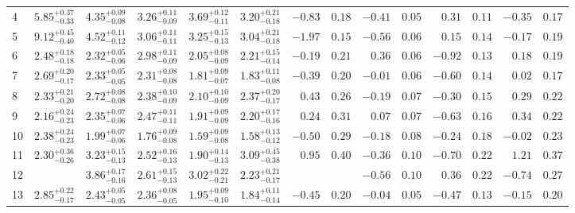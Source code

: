 \begin{tabular}{@{}l ccccc r@{ $\pm$ }l r@{ $\pm$ }l r@{ $\pm$ }l r@{ $\pm$ }l @{}}
\cmidrule{1-14}
4 & ${5.85}^{+0.37}_{-0.33}$ & ${4.35}^{+0.09}_{-0.08}$ & ${3.26}^{+0.11}_{-0.09}$ & ${3.69}^{+0.12}_{-0.11}$ & ${3.20}^{+0.21}_{-0.18}$
  & $-0.83$ & $0.18$ & $-0.41$ & $0.05$ & $0.31$ & $0.11$ & $-0.35$ & $0.17$ \\ [0.5em]
5 & ${9.12}^{+0.45}_{-0.40}$ & ${4.52}^{+0.11}_{-0.12}$ & ${3.06}^{+0.11}_{-0.11}$ & ${3.25}^{+0.15}_{-0.13}$ & ${3.04}^{+0.21}_{-0.18}$
  & $-1.97$ & $0.15$ & $-0.56$ & $0.06$ & $0.15$ & $0.14$ & $-0.17$ & $0.19$ \\ [0.5em]
6 & ${2.48}^{+0.18}_{-0.18}$ & ${2.32}^{+0.05}_{-0.06}$ & ${2.98}^{+0.11}_{-0.09}$ & ${2.05}^{+0.08}_{-0.09}$ & ${2.21}^{+0.15}_{-0.14}$
  & $-0.19$ & $0.21$ & $0.36$ & $0.06$ & $-0.92$ & $0.13$ & $0.18$ & $0.19$ \\ [0.5em]
7 & ${2.69}^{+0.20}_{-0.17}$ & ${2.33}^{+0.05}_{-0.05}$ & ${2.31}^{+0.08}_{-0.08}$ & ${1.81}^{+0.09}_{-0.07}$ & ${1.83}^{+0.11}_{-0.08}$
  & $-0.39$ & $0.20$ & $-0.01$ & $0.06$ & $-0.60$ & $0.14$ & $0.02$ & $0.17$ \\ [0.5em]
8 & ${2.33}^{+0.21}_{-0.20}$ & ${2.72}^{+0.08}_{-0.08}$ & ${2.38}^{+0.10}_{-0.09}$ & ${2.10}^{+0.10}_{-0.09}$ & ${2.37}^{+0.20}_{-0.17}$
  & $0.43$ & $0.26$ & $-0.19$ & $0.07$ & $-0.30$ & $0.15$ & $0.29$ & $0.22$ \\ [0.5em]
9 & ${2.16}^{+0.24}_{-0.23}$ & ${2.35}^{+0.07}_{-0.06}$ & ${2.47}^{+0.11}_{-0.11}$ & ${1.91}^{+0.09}_{-0.09}$ & ${2.20}^{+0.17}_{-0.16}$
  & $0.24$ & $0.31$ & $0.07$ & $0.07$ & $-0.63$ & $0.16$ & $0.34$ & $0.22$ \\ [0.5em]
10 & ${2.38}^{+0.24}_{-0.23}$ & ${1.99}^{+0.07}_{-0.06}$ & ${1.76}^{+0.09}_{-0.08}$ & ${1.59}^{+0.09}_{-0.08}$ & ${1.58}^{+0.13}_{-0.12}$
  & $-0.50$ & $0.29$ & $-0.18$ & $0.08$ & $-0.24$ & $0.18$ & $-0.02$ & $0.23$ \\

\cmidrule{1-14}
11 & ${2.30}^{+0.36}_{-0.26}$ & ${3.23}^{+0.15}_{-0.13}$ & ${2.52}^{+0.16}_{-0.13}$ & ${1.90}^{+0.14}_{-0.13}$ & ${3.09}^{+0.45}_{-0.38}$
  & $0.95$ & $0.40$ & $-0.36$ & $0.10$ & $-0.70$ & $0.22$ & $1.21$ & $0.37$ \\ [0.5em]
12 & {} & ${3.86}^{+0.17}_{-0.16}$ & ${2.61}^{+0.15}_{-0.13}$ & ${3.02}^{+0.22}_{-0.21}$ & ${2.23}^{+0.21}_{-0.17}$
  & \multicolumn{2}{c}{} & $-0.56$ & $0.10$ & $0.36$ & $0.22$ & $-0.74$ & $0.27$ \\ [0.5em]
13 & ${2.85}^{+0.22}_{-0.17}$ & ${2.43}^{+0.05}_{-0.05}$ & ${2.36}^{+0.08}_{-0.05}$ & ${1.95}^{+0.09}_{-0.10}$ & ${1.84}^{+0.11}_{-0.14}$
  & $-0.45$ & $0.20$ & $-0.04$ & $0.05$ & $-0.47$ & $0.13$ & $-0.15$ & $0.20$ \\


\end{tabular}

